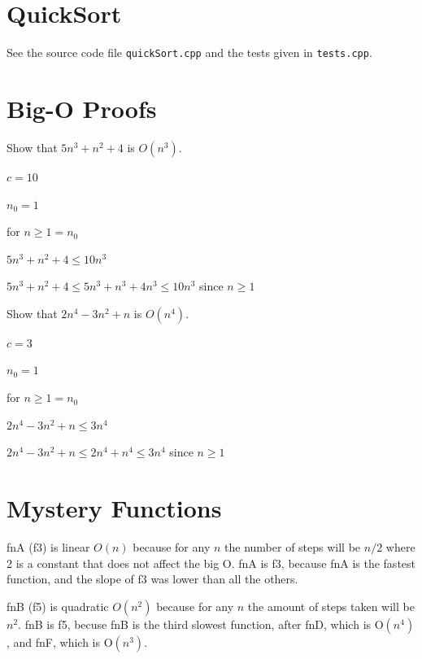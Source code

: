 \documentclass{article}
\begin{document}
    \section{QuickSort}

    See the source code file \texttt{quickSort.cpp} and the tests given in
    \texttt{tests.cpp}.

    \section{Big-O Proofs}

    \vspace{2mm}
     Show that $5n^3+n^2+4$ is $O(n^3)$.

    $c = 10$

    $n_{0} = 1$
    
    for $n \ge 1 = n_{0}$

    $5n^{3}+n^{2}+4 \le 10n^{3}$

    $5n^{3}+n^{2}+4 \le 5n^{3}+n^{3}+4n^{3} \le 10n^{3}$  since $n \ge 1$

    \vspace{1cm}
     Show that $2n^4-3n^2+n$ is $O(n^4)$.


    $c = 3$

    $n_{0} = 1$

    for $n \ge 1 = n_{0}$

    $2n^{4}-3n^{2}+n \le 3n^{4}$

    $2n^{4}-3n^{2}+n \le 2n^{4}+n^{4} \le 3n^{4}$  since $n \ge 1$

    \vspace{1cm}
    \section{Mystery Functions}


    fnA (f3) is linear $O(n)$ because for any $n$ the number of steps will be $n/2$ 
    where 2 is a constant that does not affect the big O. fnA is f3, because fnA 
    is the fastest function, and the slope of f3 was lower than all the others.
    \vspace{5mm}

    fnB (f5) is quadratic $O(n^{2})$ because for any $n$ the amount of steps 
    taken will be $n^{2}$. fnB is f5, becuse fnB is the third slowest function, 
    after fnD, which is O$(n^{4})$, and fnF, which is O$(n^{3})$.
    \vspace{5mm}
\end{document}
